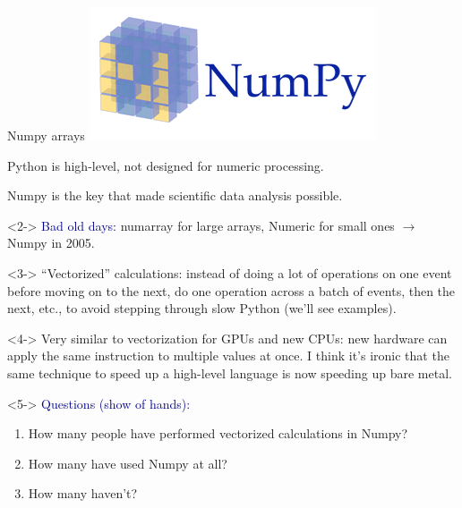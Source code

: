 \documentclass[aspectratio=169]{beamer}
\begin{document}
\begin{frame}{Numpy arrays}
\vspace{0.5 cm}
\hfill \includegraphics[height=1.3 cm]{numpy-logo.png}

\vspace{-1.3 cm}

Python is high-level, not designed for numeric processing.

Numpy is the key that made scientific data analysis possible.

\vspace{0.25 cm}
\begin{uncoverenv}<2->
\textcolor{darkblue}{Bad old days:} numarray for large arrays, Numeric for small ones $\to$ Numpy in 2005.
\end{uncoverenv}

\vspace{0.25 cm}
\begin{uncoverenv}<3->
``Vectorized'' calculations: instead of doing a lot of operations on one event before moving on to the next, do one operation across a batch of events, then the next, etc., to avoid stepping through slow Python (we'll see examples).
\end{uncoverenv}

\vspace{0.25 cm}
\begin{uncoverenv}<4->
Very similar to vectorization for GPUs and new CPUs: new hardware can apply the same instruction to multiple values at once. I think it's ironic that the same technique to speed up a high-level language is now speeding up bare metal.
\end{uncoverenv}

\vspace{0.25 cm}
\begin{uncoverenv}<5->
\small
\textcolor{darkblue}{Questions (show of hands):}
\vspace{-0.2 cm}
\begin{enumerate}\setlength{\itemsep}{-0.1 cm}
\item How many people have performed vectorized calculations in Numpy?
\item How many have used Numpy at all?
\item How many haven't?
\end{enumerate}
\end{uncoverenv}
\end{frame}
\end{document}
